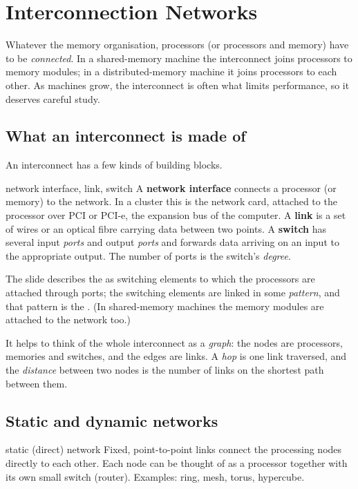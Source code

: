 \chapter{Interconnection Networks}
\label{ch:networks}

Whatever the memory organisation, processors (or processors and memory) have to be \emph{connected}. In a
shared-memory machine the interconnect joins processors to memory modules; in a distributed-memory machine it joins
processors to each other. As machines grow, the interconnect is often what limits performance, so it deserves careful study.

\section{What an interconnect is made of}

An interconnect has a few kinds of building blocks.

\begin{definition}{network interface, link, switch}
A \textbf{network interface} connects a processor (or memory) to the network. In a cluster this is the network card, attached to the
processor over PCI or PCI-e, the expansion bus of the computer. A \textbf{link} is a set of wires or an optical fibre carrying data between two points.
A \textbf{switch} has several input \emph{ports} and output \emph{ports} and forwards data arriving on an input to the appropriate
output. The number of ports is the switch's \emph{degree}.
\end{definition}

The slide describes the  as switching elements to which the processors are attached through ports; the switching elements are linked
in some \emph{pattern}, and that pattern is the . (In shared-memory machines the memory modules are
attached to the network too.)

It helps to think of the whole interconnect as a \emph{graph}: the nodes are processors, memories and switches, and the edges are links. A \emph{hop} is one link traversed,
and the \emph{distance} between two nodes is the number of links on the shortest path between them.

\section{Static and dynamic networks}

\begin{definition}{static (direct) network}
Fixed, point-to-point links connect the processing nodes directly to each other. Each node can be thought of as a processor
together with its own small switch (router). Examples: ring, mesh, torus, hypercube.
\end{definition}

